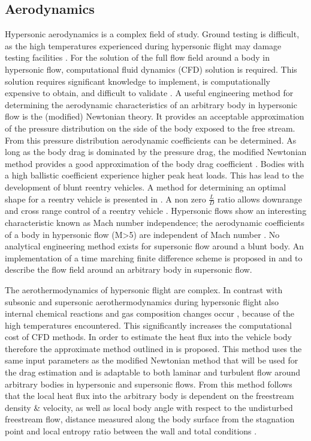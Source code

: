 \subsection{Aerodynamics} \label{sec:aero}
Hypersonic aerodynamics is a complex field of study. Ground testing is difficult, as the high temperatures experienced during hypersonic flight may damage testing facilities \cite{AndersonJr.2006, Bertin1994}. For the solution of the full flow field around a body in hypersonic flow, computational fluid dynamics (CFD) solution is required. This solution requires significant knowledge to implement, is computationally expensive to obtain, and difficult to validate \cite{AndersonJr.2006, Bertin1994}. A useful engineering method for determining the aerodynamic characteristics of an arbitrary body in hypersonic flow is the (modified) Newtonian theory. It provides an acceptable approximation of the pressure distribution on the side of the body exposed to the free stream. From this pressure distribution aerodynamic coefficients can be determined. As long as the body drag is dominated by the pressure drag, the modified Newtonian method provides a good approximation of the body drag coefficient \cite{AndersonJr.2006, Bertin1994, Bertin2006}. Bodies with a high ballistic coefficient experience higher peak heat loads. This has lead to the development of blunt reentry vehicles\cite{Bertin1994,Theisinger2009}. A method for determining an optimal shape for a reentry vehicle is presented in \cite{Theisinger2009}. A non zero $\frac{L}{D}$ ratio allows downrange and cross range control of a reentry vehicle \cite{Theisinger2009}. Hypersonic flows show an interesting characteristic known as Mach number independence; the aerodynamic coefficients of a body in hypersonic flow (M>5) are independent of Mach number \cite{Bertin1994,AndersonJr.2007,Hollis}. No analytical engineering method exists for supersonic flow around a blunt body. An implementation of a time marching finite difference scheme is proposed in \cite{AndersonJr.2007} and \cite{AndersonJr.2006} to describe the flow field around an arbitrary body in supersonic flow. 

The aerothermodynamics of hypersonic flight are complex. In contrast with subsonic and supersonic aerothermodynamics during hypersonic flight also internal chemical reactions and gas composition changes occur \cite{AndersonJr.2006}, because of the high temperatures encountered. This significantly increases the computational cost of CFD methods. In order to estimate the heat flux into the vehicle body therefore the approximate method outlined in \cite{Tauber1986} \cite{AndersonJr.2006} is proposed. This method uses the same input parameters as the modified Newtonian method that will be used for the drag estimation and is adaptable to both laminar and turbulent flow around arbitrary bodies in hypersonic and supersonic flows. From this method follows that the local heat flux into the arbitrary body is dependent on the freestream density \& velocity, as well as local body angle with respect to the undisturbed freestream flow, distance measured along the body surface from the stagnation point and local entropy ratio between the wall and total conditions \cite{Tauber1986, AndersonJr.2006}.